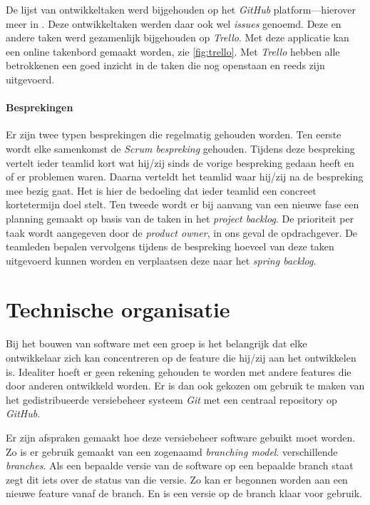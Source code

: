 De lijst van ontwikkeltaken werd bijgehouden op het \emph{GitHub} platform—hierover meer in . Deze ontwikkeltaken werden daar ook wel \emph{issues} genoemd. Deze en andere taken werd gezamenlijk bijgehouden op \emph{Trello}. Met deze applicatie kan een online takenbord gemaakt worden, zie \autoref{fig:trello}. Met \emph{Trello} hebben alle betrokkenen een goed inzicht in de taken die nog openstaan en reeds zijn uitgevoerd.

\paragraph{Besprekingen} Er zijn twee typen besprekingen die regelmatig gehouden worden. Ten eerste wordt elke samenkomst de \emph{Scrum bespreking} gehouden. Tijdens deze bespreking vertelt ieder teamlid kort wat hij/zij sinds de vorige bespreking gedaan heeft en of er problemen waren. Daarna verteldt het teamlid waar hij/zij na de bespreking mee bezig gaat. Het is hier de bedoeling dat ieder teamlid een concreet kortetermijn doel stelt.
Ten tweede wordt er bij aanvang van een nieuwe fase een planning gemaakt op basis van de taken in het \emph{project backlog}. De prioriteit per taak wordt aangegeven door de \emph{product owner}, in ons geval de opdrachgever. De teamleden bepalen vervolgens tijdens de bespreking hoeveel van deze taken uitgevoerd kunnen worden en verplaatsen deze naar het \emph{spring backlog}. 

\section{Technische organisatie} \label{sec:technische_organisatie}
Bij het bouwen van software met een groep is het belangrijk dat elke ontwikkelaar zich kan concentreren op de feature die hij/zij aan het ontwikkelen is. Idealiter hoeft er geen rekening gehouden te worden met andere features die door anderen ontwikkeld worden. Er is dan ook gekozen om gebruik te maken van het gedistribueerde versiebeheer systeem \emph{Git} met een centraal repository op \emph{GitHub}.

Er zijn afspraken gemaakt hoe deze versiebeheer software gebuikt moet worden. Zo is er gebruik gemaakt van een zogenaamd \emph{branching model}\cite{Gitflow2010}. verschillende \emph{branches}. Als een bepaalde versie van de software op een bepaalde branch staat zegt dit iets over de status van die versie. Zo kan er begonnen worden aan een nieuwe feature vanaf de  branch. En is een versie op de  branch klaar voor gebruik.

